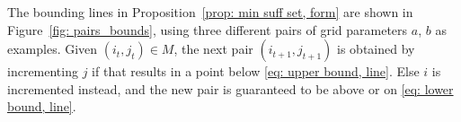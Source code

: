 \documentclass[12pt, a4paper]{article}
\newcommand{\tiles}{t} %
\newcommand{\mss}{M}
\begin{document}
The bounding lines in Proposition~\ref{prop: min suff set, form} are shown in Figure~\ref{fig: pairs_bounds}, using three different pairs of grid parameters $a$, $b$ as examples. Given $(i_\tiles,j_\tiles) \in \mss$, the next pair $(i_{\tiles+1},j_{\tiles+1})$ is obtained by incrementing $j$ if that results in a point below \eqref{eq: upper bound, line}. Else $i$ is incremented instead, and the new pair is guaranteed to be above or on \eqref{eq: lower bound, line}.

\begin{figure}
\centering%
\hfill%
\subfigure[$a = 1.35$, $b = 1$]{%
\label{fig: pairs_bounds_1p35}%
}
\end{figure}
\end{document}

